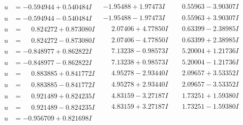 \documentclass[1p]{elsarticle_modified}
\theoremstyle{definition}
\begin{document}
$$\begin{array}{c|c|c}
\begin{aligned}
u &= -0.594944 + 0.540484 I\end{aligned}
 & -1.95488 + 1.97473 I & \phantom{-}0.55963 - 3.90307 I \\ \hline\begin{aligned}
u &= -0.594944 - 0.540484 I\end{aligned}
 & -1.95488 - 1.97473 I & \phantom{-}0.55963 + 3.90307 I \\ \hline\begin{aligned}
u &= \phantom{-}0.824272 + 0.873080 I\end{aligned}
 & \phantom{-}2.07406 + 4.77850 I & \phantom{-}0.63399 - 2.38985 I \\ \hline\begin{aligned}
u &= \phantom{-}0.824272 - 0.873080 I\end{aligned}
 & \phantom{-}2.07406 - 4.77850 I & \phantom{-}0.63399 + 2.38985 I \\ \hline\begin{aligned}
u &= -0.848977 + 0.862822 I\end{aligned}
 & \phantom{-}7.13238 - 0.98573 I & \phantom{-}5.20004 + 1.21736 I \\ \hline\begin{aligned}
u &= -0.848977 - 0.862822 I\end{aligned}
 & \phantom{-}7.13238 + 0.98573 I & \phantom{-}5.20004 - 1.21736 I \\ \hline\begin{aligned}
u &= \phantom{-}0.883885 + 0.841772 I\end{aligned}
 & \phantom{-}4.95278 - 2.93440 I & \phantom{-}2.09657 + 3.53352 I \\ \hline\begin{aligned}
u &= \phantom{-}0.883885 - 0.841772 I\end{aligned}
 & \phantom{-}4.95278 + 2.93440 I & \phantom{-}2.09657 - 3.53352 I \\ \hline\begin{aligned}
u &= \phantom{-}0.921489 + 0.824235 I\end{aligned}
 & \phantom{-}4.83159 - 3.27187 I & \phantom{-}1.73251 + 1.59380 I \\ \hline\begin{aligned}
u &= \phantom{-}0.921489 - 0.824235 I\end{aligned}
 & \phantom{-}4.83159 + 3.27187 I & \phantom{-}1.73251 - 1.59380 I \\ \hline\begin{aligned}
u &= -0.956709 + 0.821698 I\end{aligned}

\end{array}$$
\end{document}
